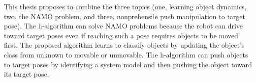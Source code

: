 This thesis proposes to combine the three topics (one, learning object dynamics, two, the \ac{NAMO} problem, and three, nonprehensile push manipulation to target pose). The \ac{h-algorithm} can solve \ac{NAMO} problems because the robot can drive toward target poses even if reaching such a pose requires objects to be moved first. The proposed algorithm learns to classify objects by updating the object's class from unknown to movable or unmovable. The \ac{h-algorithm} can push objects to target poses by identifying a system model and then pushing the object toward its target pose.\bs


